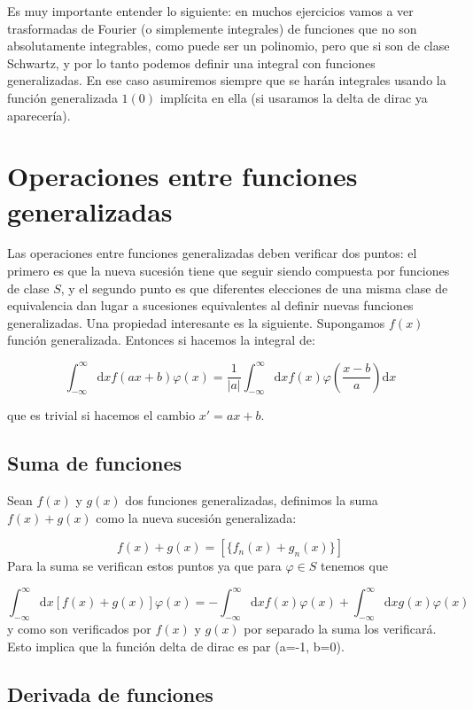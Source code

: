 \documentclass[12pt,a4paper]{book}
\newcommand{\parentesis}[1]{\left( #1  \right)}
\newcommand{\D}{\mathrm{d}}
\newcommand{\inti}{\int_{-\infty}^{\infty}}
\begin{document}
Es muy importante entender lo siguiente: en muchos ejercicios vamos a ver trasformadas de Fourier (o simplemente integrales) de funciones que no son absolutamente integrables, como puede ser un polinomio, pero que si son de clase Schwartz, y por lo tanto podemos definir una integral con funciones generalizadas. En ese caso asumiremos siempre que se harán integrales usando la función generalizada $1(0)$ implícita en ella (si usaramos la delta de dirac ya aparecería). 

\section{Operaciones entre funciones generalizadas}

Las operaciones entre funciones generalizadas deben verificar dos puntos: el primero es que la nueva sucesión tiene que seguir siendo compuesta por funciones de clase $S$, y el segundo punto es que diferentes elecciones de una misma clase de equivalencia dan lugar a sucesiones equivalentes al definir nuevas funciones generalizadas. Una propiedad interesante es la siguiente. Supongamos $f(x)$ función generalizada. Entonces si hacemos la integral de:

\begin{equation}
\inti \D x  f(ax+b) \varphi (x)  = \dfrac{1}{|a|} \inti \D x f(x) \varphi \parentesis{\frac{x-b}{a}} \D x
\end{equation}

que es trivial si hacemos el cambio $x' = ax+ b$. 

\subsection{Suma de funciones}

Sean $f(x)$ y $g(x)$ dos funciones generalizadas, definimos la suma $f(x) + g(x)$ como la nueva sucesión generalizada:

\begin{equation}
f(x) + g(x) = [ \{ f_n (x) + g_n (x) \} ]
\end{equation}
Para la suma se verifican estos puntos ya que para $\varphi \in S$ tenemos que

$$ \inti \D x [f(x) + g(x)] \varphi (x) = - \inti \D x f(x) \varphi (x) + \inti \D x g(x) \varphi (x) $$
y como son verificados por $f(x)$ y $g(x)$ por separado la suma los verificará. Esto implica que la función delta de dirac es par (a=-1, b=0). 

\subsection{Derivada de funciones}
\end{document}
